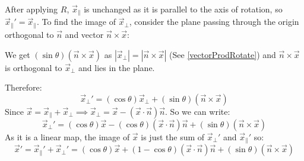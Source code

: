 \documentclass[../main.tex]{subfiles}
\begin{document}
After applying $R$, $\vec{x}_{\parallel}$ is unchanged as it is parallel to the axis of rotation, so $\vec{x}_{\parallel}' = \vec{x}_{\parallel}$.
To find the image of $\vec{x}_{\perp}$, consider the plane passing through the origin orthogonal to $\vec{n}$ and vector $\vec{n} \times \vec{x}$:
\begin{center}
\end{center}
We get $(\sin \theta)(\vec{n} \times \vec{x})$ as $|\vec{x}_{\perp}| = |\vec{n} \times \vec{x}|$ (See \cref{vectorProdRotate}) and $\vec{n} \times \vec{x}$ is orthogonal to $\vec{x}_{\perp}$ and lies in the plane.

Therefore:
\[
  \vec{x}_{\perp}' = (\cos \theta)\vec{x}_{\perp} + (\sin \theta)(\vec{n} \times \vec{x})
\]
Since $\vec{x} = \vec{x}_{\parallel} + \vec{x}_{\perp} \implies \vec{x}_{\perp} = \vec{x} - (\vec{x} \cdot \vec{n})\vec{n}$.
So we can write:
\[
  \vec{x}_{\perp}' = (\cos \theta)\vec{x} - (\cos \theta)(\vec{x} \cdot \vec{n})\vec{n} + (\sin \theta)(\vec{n} \times \vec{x})
\]
As it is a linear map, the image of $\vec{x}$ is just the sum of $\vec{x}_{\perp}'$ and $\vec{x}_{\parallel}'$ so:
\[
  \vec{x}' = \vec{x}_{\parallel}' + \vec{x}_{\perp}' = (\cos \theta)\vec{x} + (1 - \cos\theta)(\vec{x} \cdot \vec{n})\vec{n} + (\sin \theta)(\vec{n} \times \vec{x})
\]
\end{document}
